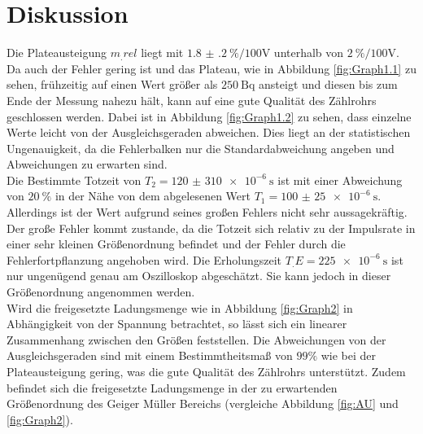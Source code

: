 
\section{Diskussion}
\label{sec:Diskussion}

Die Plateausteigung $m_.{rel}$ liegt mit $\SI{1.8(2)}{\%\per100\volt}$ unterhalb von $\SI{2}{\%\per100\volt}$. Da auch der Fehler gering ist und das Plateau, wie in Abbildung \ref{fig:Graph1.1} zu sehen, frühzeitig auf einen Wert größer als $\SI{250}{\becquerel}$ ansteigt und diesen bis zum Ende der Messung nahezu hält, kann auf eine gute Qualität des Zählrohrs geschlossen werden. Dabei ist in Abbildung \ref{fig:Graph1.2} zu sehen, dass einzelne Werte leicht von der Ausgleichsgeraden abweichen. Dies liegt an der statistischen Ungenauigkeit, da die Fehlerbalken nur die Standardabweichung angeben und Abweichungen zu erwarten sind.\\
Die Bestimmte Totzeit von $T_2=\SI{120(310)e-6}{\second}$ ist mit einer Abweichung von $\SI{20}{\%} $ in der Nähe von dem abgelesenen Wert $T_1=\SI{100(25)e-6}{\second}$. Allerdings ist der Wert aufgrund seines großen Fehlers nicht sehr aussagekräftig. Der große Fehler kommt zustande, da die Totzeit sich relativ zu der Impulsrate in einer sehr kleinen Größenordnung befindet und der Fehler durch die Fehlerfortpflanzung angehoben wird. Die Erholungszeit $T_.E=\SI{225e-6}{\second}$ ist nur ungenügend genau am Oszilloskop abgeschätzt. Sie kann jedoch in dieser Größenordnung angenommen werden.\\
Wird die freigesetzte Ladungsmenge wie in Abbildung \ref{fig:Graph2} in Abhängigkeit von der Spannung betrachtet, so lässt sich ein linearer Zusammenhang zwischen den Größen feststellen. Die Abweichungen von der Ausgleichsgeraden sind mit einem Bestimmtheitsmaß von $99\%$ wie bei der Plateausteigung gering, was die gute Qualität des Zählrohrs unterstützt. Zudem befindet sich die freigesetzte Ladungsmenge in der zu erwartenden Größenordnung des Geiger Müller Bereichs (vergleiche Abbildung \ref{fig:AU} und \ref{fig:Graph2}).   